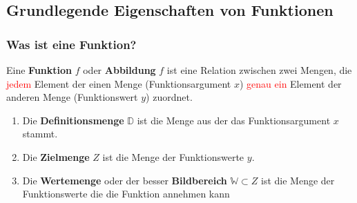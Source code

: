 \subsection{Grundlegende Eigenschaften von Funktionen}
\subsubsection{Was ist eine Funktion?}
Eine \textbf{Funktion} $f$ oder \textbf{Abbildung} $f$ ist eine Relation zwischen zwei Mengen, die \textcolor{red}{jedem} Element der einen Menge (Funktionsargument $x$) \textcolor{red}{genau ein} Element der anderen Menge (Funktionswert $y$) zuordnet.
\begin{enumerate}
\item Die \textbf{Definitionsmenge} $\mathbb{D}$ ist die Menge aus der das Funktionsargument $x$ stammt.
\item Die \textbf{Zielmenge} $Z$ ist die Menge der Funktionswerte $y$.
\item Die \textbf{Wertemenge} oder der besser \textbf{Bildbereich} $\mathbb{W} \subset Z$ ist die Menge der Funktionswerte die die Funktion annehmen kann
\end{enumerate}
